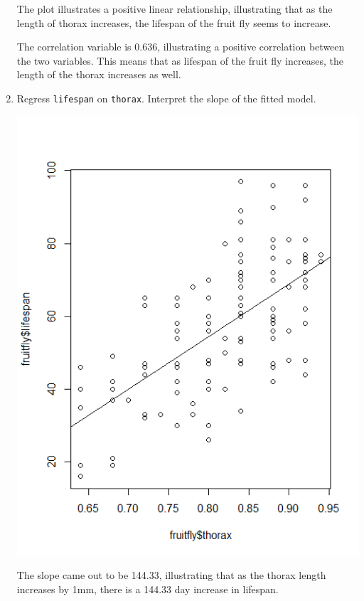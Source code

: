 \documentclass[12pt,letterpaper]{article}
\begin{document}
\begin{enumerate}
The plot illustrates a positive linear relationship, illustrating that as the length of thorax increases, the lifespan of the fruit fly seems to increase. 



The correlation variable is 0.636, illustrating a positive correlation between the two variables. This means that as lifespan of the fruit fly increases, the length of the thorax increases as well. 

		\vspace{2cm}
	\item
	Regress \texttt{lifespan} on \texttt{thorax}.  Interpret the slope of the fitted model.



\includegraphics{Q33}

The slope came out to be 144.33, illustrating that as the thorax length increases by 1mm, there is a 144.33 day increase in lifespan. 


\end{enumerate}
\end{document}
